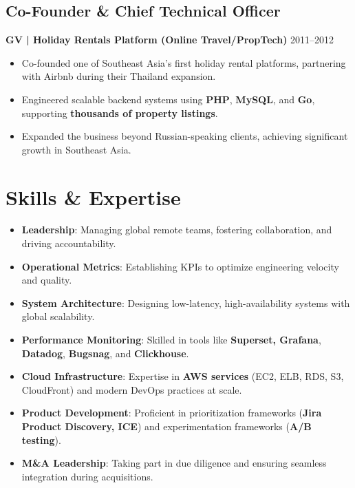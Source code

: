 \documentclass[11pt,a4paper]{article}
\begin{document}
\subsection*{Co-Founder \& Chief Technical Officer}
\textbf{GV | Holiday Rentals Platform (Online Travel/PropTech)} \hfill 2011--2012
\begin{itemize}
    \item Co-founded one of Southeast Asia’s first holiday rental platforms, partnering with Airbnb during their Thailand expansion.
    \item Engineered scalable backend systems using \textbf{PHP}, \textbf{MySQL}, and \textbf{Go}, supporting \textbf{thousands of property listings}.
    \item Expanded the business beyond Russian-speaking clients, achieving significant growth in Southeast Asia.
\end{itemize}

\section*{Skills \& Expertise}
\begin{multicols}{2}
\begin{itemize}
    \item \textbf{Leadership}: Managing global remote teams, fostering collaboration, and driving accountability.
    \item \textbf{Operational Metrics}: Establishing KPIs to optimize engineering velocity and quality.
    \item \textbf{System Architecture}: Designing low-latency, high-availability systems with global scalability.
    \item \textbf{Performance Monitoring}: Skilled in tools like \textbf{Superset, Grafana}, \textbf{Datadog}, \textbf{Bugsnag}, and \textbf{Clickhouse}.
    \item \textbf{Cloud Infrastructure}: Expertise in \textbf{AWS services} (EC2, ELB, RDS, S3, CloudFront) and modern DevOps practices at scale.
    \item \textbf{Product Development}: Proficient in prioritization frameworks (\textbf{Jira Product Discovery, ICE}) and experimentation frameworks (\textbf{A/B testing}).
    \item \textbf{M\&A Leadership}: Taking part in due diligence and ensuring seamless integration during acquisitions.
\end{itemize}
\end{multicols}
\end{document}
